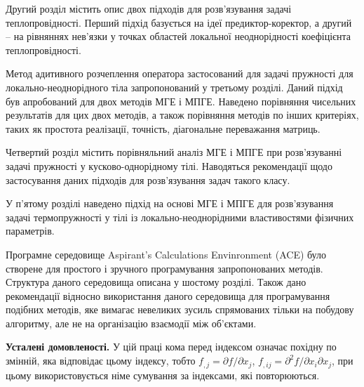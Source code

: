 Другий розділ містить опис двох підходів для розв'язування задачі
теплопровідності. Перший підхід базується на ідеї предиктор-коректор, а
другий -- на рівняннях нев'язки у точках областей локальної
неоднорідності коефіцієнта теплопровідності.

Метод адитивного розчеплення оператора застосований для задачі пружності
для локально-неоднорідного тіла запропонований у третьому розділі. Даний
підхід був апробований для двох методів МГЕ і МПГЕ. Наведено порівняння
чисельних результатів для цих двох методів, а також порівняння методів
по інших критеріях, таких як простота реалізації, точність, діагональне
переважання матриць.

Четвертий розділ містить порівняльний аналіз МГЕ і МПГЕ при розв'язуванні задачі пружності у кусково-однорідному тілі. Наводяться рекомендації щодо застосування даних підходів для розв'язування задач такого класу.

У п'ятому розділі наведено підхід на основі МГЕ і МПГЕ для розв'язування
задачі термопружності у тілі із локально-неоднорідними властивостями
фізичних параметрів.

Програмне середовище Aspirant's Calculations Envinronment (ACE) було
створене для простого і зручного програмування запропонованих методів.
Структура даного середовища описана у шостому розділі. Також дано
рекомендації відносно використання даного середовища для програмування
подібних методів, яке вимагає невеликих зусиль спрямованих тільки на
побудову алгоритму, але не на організацію взаємодії між об'єктами.

\textbf{Усталені домовленості.} У цій праці кома перед індексом
означає похідну по змінній, яка відповідає цьому індексу, тобто
 ${f_{,j} = \partial}{f/\partial}x_{j}$, ${{f_{,ij} = \partial^{2}}{f/\partial}x_{i}\partial x_{j}}{}$,
при цьому викори­стовується німе сумування за індек­сами, які
повторюються.
